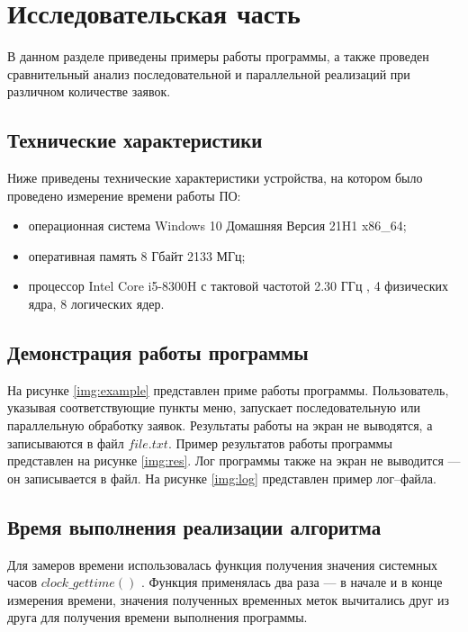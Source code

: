 \chapter{Исследовательская часть}

В данном разделе  приведены примеры работы программы, а также проведен сравнительный анализ последовательной и параллельной реализаций при различном количестве заявок.

\section{Технические характеристики}

Ниже приведены технические характеристики устройства, на котором было проведено измерение времени работы ПО:

\begin{itemize}
	\item операционная система Windows 10 Домашняя Версия 21H1 \cite{windows} x86\_64;
	\item оперативная память 8 Гбайт 2133 МГц;
	\item процессор Intel Core i5-8300H с тактовой частотой 2.30 ГГц \cite{intel}, 4 физических ядра, 8 логических ядер.
\end{itemize}

\section{Демонстрация работы программы}

На рисунке \ref{img:example} представлен приме работы программы. Пользователь, указывая соответствующие пункты меню, запускает последовательную или параллельную обработку заявок. Результаты работы на экран не выводятся, а записываются в файл $file.txt$. Пример результатов работы программы представлен на рисунке \ref{img:res}. Лог программы также на экран не выводится --- он записывается в файл. На рисунке \ref{img:log} представлен пример лог--файла.

\clearpage
\section{Время выполнения реализации алгоритма}

Для замеров времени использовалась функция получения значения системных часов $clock\_gettime()$ \cite{gettime}. Функция применялась два раза --- в начале и в конце измерения времени, значения полученных временных меток вычитались друг из друга для получения времени выполнения программы.

